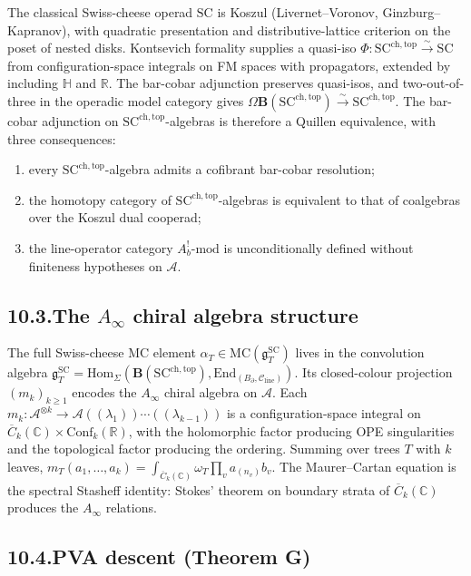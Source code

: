 \documentclass[11pt,reqno]{amsart}
\theoremstyle{definition}
\theoremstyle{remark}
\providecommand{\cA}{\mathcal{A}}
\providecommand{\cC}{\mathcal{C}}
\providecommand{\MC}{\mathrm{MC}}
\providecommand{\Hom}{\mathrm{Hom}}
\providecommand{\FM}{\overline{C}}
\providecommand{\fg}{\mathfrak{g}}
\providecommand{\bC}{\mathbb{C}}
\providecommand{\bR}{\mathbb{R}}
\providecommand{\SCchtop}{\mathrm{SC}^{\mathrm{ch,top}}}
\providecommand{\End}{\mathrm{End}}
\providecommand{\Conf}{\mathrm{Conf}}
\providecommand{\SC}{\mathrm{SC}}
\numberwithin{equation}{section}
\begin{document}
The classical Swiss-cheese operad $\SC$ is Koszul
(Livernet--Voronov, Ginzburg--Kapranov), with quadratic
presentation and distributive-lattice criterion on the poset
of nested disks. Kontsevich formality supplies a quasi-iso
$\Phi\colon \SCchtop \xrightarrow{\sim} \SC$ from
configuration-space integrals on FM spaces with propagators,
extended by including $\mathbb H$ and $\bR$. The bar-cobar
adjunction preserves quasi-isos, and two-out-of-three in the
operadic model category gives
$\Omega\mathbf B(\SCchtop) \xrightarrow{\sim} \SCchtop$. The
bar-cobar adjunction on $\SCchtop$-algebras is therefore a
Quillen equivalence, with three consequences:
\begin{enumerate}[label=(\roman*),nosep]
\item every $\SCchtop$-algebra admits a cofibrant bar-cobar
resolution;
\item the homotopy category of $\SCchtop$-algebras is
equivalent to that of coalgebras over the Koszul dual
cooperad;
\item the line-operator category $A_b^!\text{-mod}$ is
unconditionally defined without finiteness hypotheses on $\cA$.
\end{enumerate}

\subsection*{10.3.\enspace The $A_\infty$ chiral algebra structure}

The full Swiss-cheese MC element $\alpha_T \in \MC(\fg^{\SC}_T)$
lives in the convolution algebra
$\fg^{\SC}_T = \Hom_\Sigma(\mathbf B(\SCchtop),
\End_{(B_\partial, \cC_{\mathrm{line}})})$. Its closed-colour
projection $(m_k)_{k \ge 1}$ encodes the $A_\infty$ chiral
algebra on $\cA$. Each $m_k\colon \cA^{\otimes k} \to
\cA(\!(\lambda_1)\!)\cdots(\!(\lambda_{k-1})\!)$ is a
configuration-space integral on
$\FM_k(\bC) \times \Conf_k(\bR)$, with the holomorphic factor
producing OPE singularities and the topological factor
producing the ordering. Summing over trees $T$ with $k$ leaves,
$m_T(a_1,\ldots,a_k) = \int_{\FM_k(\bC)}\omega_T \prod_{v}
a_{(n_v)} b_v$. The Maurer--Cartan equation is the spectral
Stasheff identity: Stokes' theorem on boundary strata of
$\FM_k(\bC)$ produces the $A_\infty$ relations.

\subsection*{10.4.\enspace PVA descent (Theorem G)}
\end{document}
